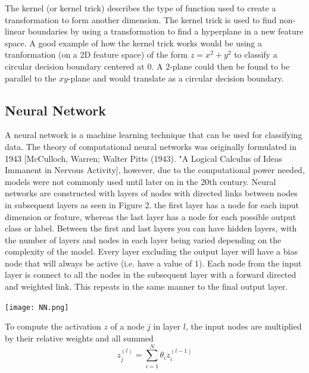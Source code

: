 \documentclass[a4paper,11pt,twoside]{article}
\begin{document}
The kernel (or kernel trick) describes the type of function used to create a transformation to form another dimension. The kernel trick is used to find non-linear boundaries by using a transformation to find a hyperplane in a new feature space. A good example of how the kernel trick works would be using a tranformation (on a 2D feature space) of the form $z=x^2+y^2$ to classify a circular decision boundary centered at 0. A 2-plane could then be found to be parallel to the $xy$-plane and would translate as a circular decision boundary.

\subsection{Neural Network}

A neural network is a machine learning technique that can be used for classifying data. The theory of computational neural networks was originally formulated in 1943 [McCulloch, Warren; Walter Pitts (1943). "A Logical Calculus of Ideas Immanent in Nervous Activity], however, due to the computational power needed, models were not commonly used until later on in the 20th century.  
\newline
\newline
Neural networks are constructed with layers of nodes with directed links between nodes in subsequent layers as seen in Figure 2. the first layer has a node for each input dimension or feature, whereas the last layer has a node for each possible output class or label. Between the first and last layers you can have hidden layers, with the number of layers and nodes in each layer being varied depending on the complexity of the model. Every layer excluding the output layer will have a bias node that will always be active (i.e. have a value of 1). Each node from the input layer is connect to all the nodes in the subsequent layer with a forward directed and weighted link. This repeats in the same manner to the final output layer. 

\begin{center}
\texttt{[image: NN.png]}

\end{center}

To compute the activation $z$ of a node $j$ in layer $l$, the input nodes are multiplied by their relative weights and all summed
\begin{equation}
z^{(l)}_j = \sum_{i=1}^N \theta_i z^{(l-1)}_i
\end{equation}
\end{document}
